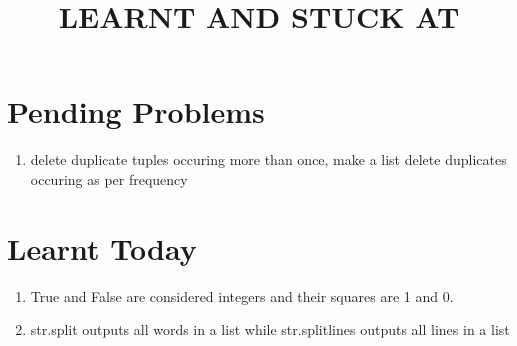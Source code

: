 \documentclass {article}
\title {LEARNT AND STUCK AT}
\begin{document}
\maketitle

\section{Pending Problems}
\begin{enumerate}
\item delete duplicate tuples occuring more than once, make a list delete duplicates occuring as per frequency
\end{enumerate}

\section {Learnt Today}
\begin{enumerate}
\item True and False are considered integers and their squares are 1 and 0.
\item str.split outputs all words in a list while str.splitlines outputs all lines in a list
\end{enumerate}
\end{document}
